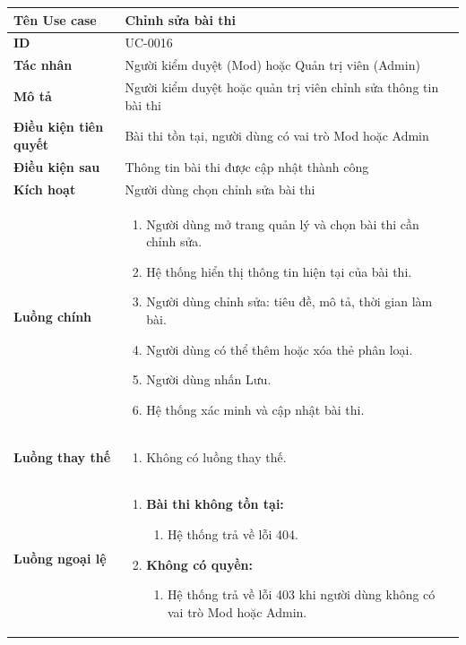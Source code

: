 {
\small
\renewcommand{\arraystretch}{1.15}

\begin{tabularx}{\textwidth}{|>{\raggedright\arraybackslash}p{3.5cm}|>{\raggedright\arraybackslash}X|}
\hline
\textbf{Tên Use case} & Chỉnh sửa bài thi \\
\hline
\textbf{ID} & UC-0016 \\
\hline
\textbf{Tác nhân} & Người kiểm duyệt (Mod) hoặc Quản trị viên (Admin) \\
\hline
\textbf{Mô tả} & Người kiểm duyệt hoặc quản trị viên chỉnh sửa thông tin bài thi \\
\hline
\textbf{Điều kiện tiên quyết} & Bài thi tồn tại, người dùng có vai trò Mod hoặc Admin \\
\hline
\textbf{Điều kiện sau} & Thông tin bài thi được cập nhật thành công \\
\hline
\textbf{Kích hoạt} & Người dùng chọn chỉnh sửa bài thi \\
\hline
\textbf{Luồng chính} &
\begin{enumerate}
    \item Người dùng mở trang quản lý và chọn bài thi cần chỉnh sửa.
    \item Hệ thống hiển thị thông tin hiện tại của bài thi.
    \item Người dùng chỉnh sửa: tiêu đề, mô tả, thời gian làm bài.
    \item Người dùng có thể thêm hoặc xóa thẻ phân loại.
    \item Người dùng nhấn Lưu.
    \item Hệ thống xác minh và cập nhật bài thi.
\end{enumerate} \\
\hline
\textbf{Luồng thay thế} &
\begin{enumerate}
    \item Không có luồng thay thế.
\end{enumerate} \\
\hline
\textbf{Luồng ngoại lệ} &
\begin{enumerate}
    \item \textbf{Bài thi không tồn tại:}
    \begin{enumerate}
        \item[1Err.] Hệ thống trả về lỗi 404.
    \end{enumerate}
    \item \textbf{Không có quyền:}
    \begin{enumerate}
        \item[1Err2.] Hệ thống trả về lỗi 403 khi người dùng không có vai trò Mod hoặc Admin.
    \end{enumerate}
\end{enumerate} \\
\hline
\end{tabularx}
}
